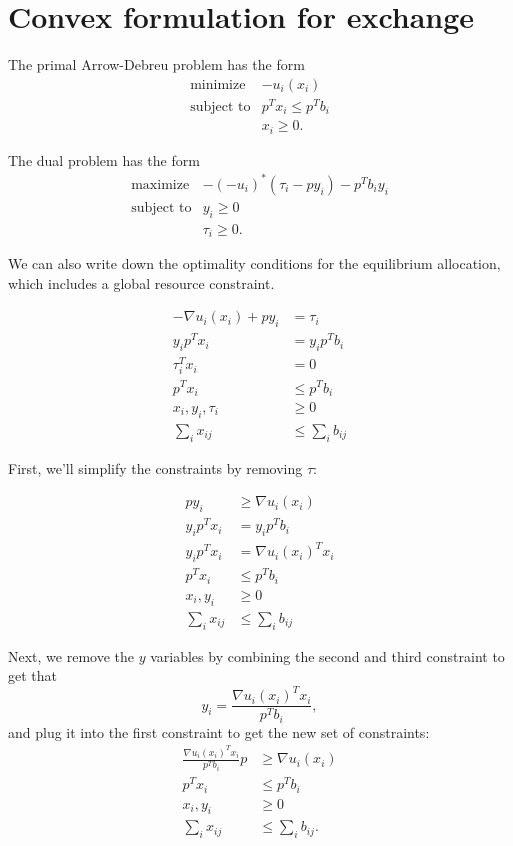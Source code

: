 \documentclass[12pt]{article}
\begin{document}
\appendix




\section{Convex formulation for exchange}
\label{sec:exchange_proof}
The primal Arrow-Debreu problem has the form
\[
\begin{array}{ll}
\mbox{minimize} & - u_i(x_i)\\
\mbox{subject to} & p^T x_i \leq p^T b_i\\
& x_i \geq 0.
\end{array}
\]

The dual problem has the form
\[
\begin{array}{ll}
\mbox{maximize} & -(- u_i)^*(\tau_i - p y_i) - p^T b_i y_i\\
\mbox{subject to} & y_i \geq 0\\
& \tau_i \geq 0.
\end{array}
\]

We can also write down the optimality conditions for the equilibrium allocation,
which includes a global resource constraint.

\begin{align*}
-\nabla u_i(x_i) + p y_i &= \tau_i\\
y_i p^T x_i &= y_i p^T b_i \\
\tau_i^T x_i &= 0\\
p^T x_i &\leq p^T b_i\\
x_i, y_i, \tau_i &\geq 0\\
\sum_{i} x_{ij} &\leq \sum_{i} b_{ij}
\end{align*}

First, we'll simplify the constraints by removing $\tau$:

\begin{align*}
p y_i &\geq \nabla u_i(x_i) \\
y_i p^T x_i &= y_i p^T b_i \\
y_i p^T x_i &= \nabla u_i(x_i)^T x_i\\
p^T x_i &\leq p^T b_i\\
x_i, y_i &\geq 0\\
\sum_{i} x_{ij} &\leq \sum_{i} b_{ij}
\end{align*}

Next, we remove the $y$ variables by combining the second and third constraint
to get that
\[
y_i = \frac{\nabla u_i(x_i)^T x_i}{p^T b_i},
\]
and plug it into the first constraint to get the new set of constraints:
\begin{align*}
\frac{\nabla u_i(x_i)^T x_i}{p^T b_i} p &\geq \nabla u_i(x_i) \\
p^T x_i &\leq p^T b_i\\
x_i, y_i &\geq 0\\
\sum_{i} x_{ij} &\leq \sum_{i} b_{ij}.
\end{align*}
\end{document}
